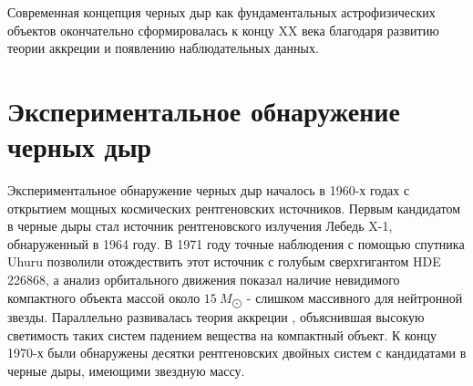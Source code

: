Современная концепция черных дыр как фундаментальных астрофизических объектов окончательно сформировалась к концу XX века благодаря развитию теории аккреции и появлению наблюдательных данных. 

%
%
%


\section{Экспериментальное обнаружение черных дыр}\label{sec:1.2}

Экспериментальное обнаружение черных дыр началось в 1960-х годах с открытием мощных космических рентгеновских источников. Первым кандидатом в черные дыры стал источник рентгеновского излучения Лебедь X-1, обнаруженный в 1964 году. В 1971 году точные наблюдения с помощью спутника Uhuru позволили отождествить этот источник с голубым сверхгигантом HDE 226868, а анализ орбитального движения показал наличие невидимого компактного объекта массой около \(15~M_{\bigodot}\) - слишком массивного для нейтронной звезды. Параллельно развивалась теория аккреции \cite{shakura1973black}, объяснившая высокую светимость таких систем падением вещества на компактный объект. К концу 1970-х были обнаружены десятки рентгеновских двойных систем с кандидатами в черные дыры, имеющими звездную массу.

